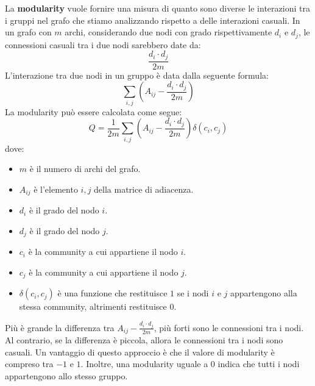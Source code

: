 La \textbf{modularity} vuole fornire una misura di quanto sono diverse le
interazioni tra i gruppi nel grafo che stiamo analizzando rispetto a delle
interazioni casuali. In un grafo con $m$ archi, considerando due nodi con grado
rispettivamente $d_i$ e $d_j$, le connessioni casuali tra i due nodi sarebbero
date da:
\begin{equation}
    \frac{d_i \cdot d_j}{2m}
\end{equation}
L'interazione tra due nodi in un gruppo è data dalla seguente formula:
\begin{equation}
    \sum_{i, j}\left(A_{ij} - \frac{d_i \cdot d_j}{2m}\right)
\end{equation}
La modularity può essere calcolata come segue:
\begin{equation}
    Q = \frac{1}{2m} \sum_{i, j} \left( A_{ij} - \frac{d_i \cdot d_j}{2m} \right) \delta(c_i, c_j)
\end{equation}
dove:
\begin{itemize}
    \item $m$ è il numero di archi del grafo.
    \item $A_{ij}$ è l'elemento $i, j$ della matrice di adiacenza.
    \item $d_i$ è il grado del nodo $i$.
    \item $d_j$ è il grado del nodo $j$.
    \item $c_i$ è la community a cui appartiene il nodo $i$.
    \item $c_j$ è la community a cui appartiene il nodo $j$.
    \item $\delta(c_i, c_j)$ è una funzione che restituisce $1$ se i nodi $i$ e
          $j$ appartengono alla stessa community, altrimenti restituisce $0$.
\end{itemize}

Più è grande la differenza tra $A_{ij} - \frac{d_i \cdot d_j}{2m}$, più forti
sono le connessioni tra i nodi. Al contrario, se la differenza è piccola,
allora le connessioni tra i nodi sono casuali.
Un vantaggio di questo approccio è che il valore di modularity è compreso tra
$-1$ e $1$. Inoltre, una modularity uguale a $0$ indica che tutti i nodi
appartengono allo stesso gruppo.

